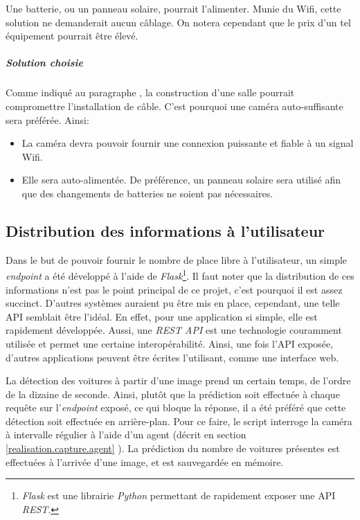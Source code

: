 Une batterie, ou un panneau solaire, pourrait l'alimenter. Munie du Wifi, cette solution ne demanderait aucun câblage. On notera cependant que le prix d'un tel équipement pourrait être élevé.

\subparagraph{Solution choisie}

Comme indiqué au paragraphe , la construction d'une salle pourrait compromettre l'installation de câble. C'est pourquoi une caméra auto-suffisante sera préférée. Ainsi:
\begin{itemize}
    \item La caméra devra pouvoir fournir une connexion puissante et fiable à un signal Wifi.
    \item Elle sera auto-alimentée. De préférence, un panneau solaire sera utilisé afin que des changements de batteries ne soient pas nécessaires.
\end{itemize}

\subsection{Distribution des informations à l'utilisateur}
Dans le but de pouvoir fournir le nombre de place libre à l'utilisateur, un simple \textit{endpoint} a été développé à l'aide de \textit{Flask}\footnote{\textit{Flask} est une librairie \textit{Python} permettant de rapidement exposer une API \textit{REST}.\autocite{lib:flask}}. Il faut noter que la distribution de ces informations n'est pas le point principal de ce projet, c'est pourquoi il est assez succinct.
D'autres systèmes auraient pu être mis en place, cependant, une telle API semblait être l'idéal. En effet, pour une application si simple, elle est rapidement développée. Aussi, une \textit{REST API} est une technologie couramment utilisée et permet une certaine interopérabilité. Ainsi, une fois l'API exposée, d'autres applications peuvent être écrites l'utilisant, comme une interface web.  

La détection des voitures à partir d'une image prend un certain temps, de l'ordre de la dizaine de seconde. Ainsi, plutôt que la prédiction soit effectuée à chaque requête sur l'\textit{endpoint} exposé, ce qui bloque la réponse, il a été préféré que cette détection soit effectuée en arrière-plan. Pour ce faire, le script interroge la caméra à intervalle régulier à l'aide d'un agent (décrit en section \ref{realisation.capture.agent} ). La prédiction du nombre de voitures présentes est effectuées à l'arrivée d'une image, et est sauvegardée en mémoire.

